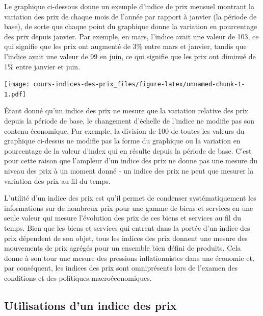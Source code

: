 \documentclass[]{article}
\begin{document}
Le graphique ci-dessous donne un exemple d'indice de prix mensuel montrant la variation des prix de chaque mois de l'année par rapport à janvier (la période de base), de sorte que chaque point du graphique donne la variation en pourcentage des prix depuis janvier. Par exemple, en mars, l'indice avait une valeur de 103, ce qui signifie que les prix ont augmenté de 3\% entre mars et janvier, tandis que l'indice avait une valeur de 99 en juin, ce qui signifie que les prix ont diminué de 1\% entre janvier et juin.

\texttt{[image: cours-indices-des-prix\_files/figure-latex/unnamed-chunk-1-1.pdf]}

Étant donné qu'un indice des prix ne mesure que la variation relative des prix depuis la période de base, le changement d'échelle de l'indice ne modifie pas son contenu économique. Par exemple, la division de 100 de toutes les valeurs du graphique ci-dessus ne modifie pas la forme du graphique ou la variation en pourcentage de la valeur d'index qui en résulte depuis la période de base. C'est pour cette raison que l'ampleur d'un indice des prix ne donne pas une mesure du niveau des prix à un moment donné - un indice des prix ne peut que mesurer la variation des prix au fil du temps.

L'utilité d'un indice des prix est qu'il permet de condenser systématiquement les informations sur de nombreux prix pour une gamme de biens et services en une seule valeur qui mesure l'évolution des prix de ces biens et services au fil du temps. Bien que les biens et services qui entrent dans la portée d'un indice des prix dépendent de son objet, tous les indices des prix donnent une mesure des mouvements de prix agrégés pour un ensemble bien défini de produits. Cela donne à son tour une mesure des pressions inflationnistes dans une économie et, par conséquent, les indices des prix sont omniprésents lors de l'examen des conditions et des politiques macroéconomiques.

\hypertarget{utilisations-dun-indice-des-prix}{%
\subsection{Utilisations d'un indice des prix}\label{utilisations-dun-indice-des-prix}}
\end{document}
